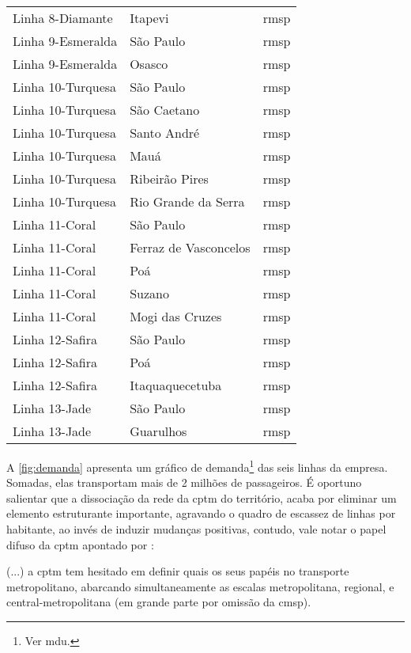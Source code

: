 \documentclass[11pt,fleqn]{book} %
\begin{document}
\begin{center}
\begin{longtable}{|l|l|l|}
		Linha 8-Diamante & Itapevi & \gls{rmsp} \\
		Linha 9-Esmeralda & São Paulo & \gls{rmsp} \\
		Linha 9-Esmeralda & Osasco & \gls{rmsp} \\
		Linha 10-Turquesa & São Paulo & \gls{rmsp} \\
		Linha 10-Turquesa & São Caetano & \gls{rmsp} \\
		Linha 10-Turquesa & Santo André & \gls{rmsp} \\
		Linha 10-Turquesa & Mauá & \gls{rmsp} \\
		Linha 10-Turquesa & Ribeirão Pires & \gls{rmsp} \\
		Linha 10-Turquesa & Rio Grande da Serra & \gls{rmsp} \\
		Linha 11-Coral & São Paulo & \gls{rmsp} \\
		Linha 11-Coral & Ferraz de Vasconcelos & \gls{rmsp} \\
		Linha 11-Coral & Poá & \gls{rmsp} \\
		Linha 11-Coral & Suzano & \gls{rmsp} \\
		Linha 11-Coral & Mogi das Cruzes & \gls{rmsp} \\
		Linha 12-Safira & São Paulo & \gls{rmsp} \\
		Linha 12-Safira & Poá & \gls{rmsp} \\
		Linha 12-Safira & Itaquaquecetuba & \gls{rmsp} \\
		Linha 13-Jade & São Paulo & \gls{rmsp} \\
		Linha 13-Jade & Guarulhos & \gls{rmsp} \\
		\end{longtable}
\end{center}	

A \autoref{fig:demanda} apresenta um gráfico de demanda\footnote{Ver \gls{mdu}.} das seis linhas da empresa. Somadas, elas transportam mais de 2 milhões de passageiros. É oportuno salientar que a dissociação da rede da \gls{cptm} do território, acaba por eliminar um elemento estruturante importante, agravando o quadro de escassez de linhas por habitante, ao invés de induzir mudanças positivas, contudo, vale notar o papel difuso da \gls{cptm} apontado por \cite[p. 122]{Isoda}: 

\begin{citacao}
	(...) a \gls{cptm} tem hesitado em definir quais os seus papéis no transporte metropolitano, abarcando simultaneamente as escalas metropolitana, regional, e central-metropolitana (em grande parte por omissão da \gls{cmsp}).
\end{citacao}
\end{document}
